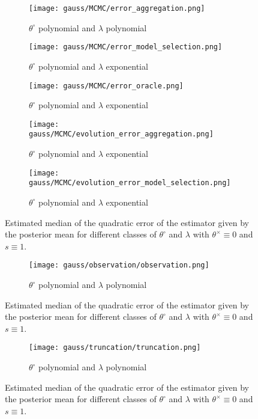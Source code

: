 \begin{figure}
\centering
\begin{subfigure}{.5\textwidth}
  \centering
  \texttt{[image: gauss/MCMC/error\_aggregation.png]}
  \caption{$\theta^{\circ}$ polynomial and $\lambda$ polynomial}
  \label{fig3:sub1}
\end{subfigure}%
\begin{subfigure}{.5\textwidth}
  \centering
  \texttt{[image: gauss/MCMC/error\_model\_selection.png]}
  \caption{$\theta^{\circ}$ polynomial and $\lambda$ exponential}
  \label{fig3:sub2}
\end{subfigure}
\begin{subfigure}{.5\textwidth}
  \centering
  \texttt{[image: gauss/MCMC/error\_oracle.png]}
  \caption{$\theta^{\circ}$ polynomial and $\lambda$ exponential}
  \label{fig3:sub2}
\end{subfigure}
\begin{subfigure}{.5\textwidth}
  \centering
  \texttt{[image: gauss/MCMC/evolution\_error\_aggregation.png]}
  \caption{$\theta^{\circ}$ polynomial and $\lambda$ exponential}
  \label{fig3:sub2}
\end{subfigure}
\begin{subfigure}{.5\textwidth}
  \centering
  \texttt{[image: gauss/MCMC/evolution\_error\_model\_selection.png]}
  \caption{$\theta^{\circ}$ polynomial and $\lambda$ exponential}
  \label{fig3:sub2}
\end{subfigure}
\caption{Estimated median of the quadratic error of the estimator given by the posterior mean for different classes of $\theta^{\circ}$ and $\lambda$ with $\theta^{\times} \equiv 0$ and $s \equiv 1$.}
\label{EQM}
\end{figure}

\begin{figure}
\centering
\begin{subfigure}{.5\textwidth}
  \centering
  \texttt{[image: gauss/observation/observation.png]}
  \caption{$\theta^{\circ}$ polynomial and $\lambda$ polynomial}
  \label{fig3:sub1}
\end{subfigure}%
\caption{Estimated median of the quadratic error of the estimator given by the posterior mean for different classes of $\theta^{\circ}$ and $\lambda$ with $\theta^{\times} \equiv 0$ and $s \equiv 1$.}
\label{EQM}
\end{figure}


\begin{figure}
\centering
\begin{subfigure}{.5\textwidth}
  \centering
  \texttt{[image: gauss/truncation/truncation.png]}
  \caption{$\theta^{\circ}$ polynomial and $\lambda$ polynomial}
  \label{fig3:sub1}
\end{subfigure}%
\caption{Estimated median of the quadratic error of the estimator given by the posterior mean for different classes of $\theta^{\circ}$ and $\lambda$ with $\theta^{\times} \equiv 0$ and $s \equiv 1$.}
\label{EQM}
\end{figure}


